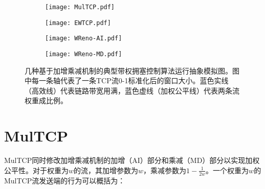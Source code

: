 \documentclass[winfonts]{njuthesis}
\begin{document}
\begin{figure}[ht!]
  \centering
  \begin{subfigure}{.4\textwidth}
    \centering
      \texttt{[image: MulTCP.pdf]}
      \label{fig:MulTCP}
  \end{subfigure}
  \hspace{1em}
  \begin{subfigure}{.4\textwidth}
    \centering
      \texttt{[image: EWTCP.pdf]}
      \label{fig:EWTCP}
  \end{subfigure}
  \begin{subfigure}{.4\textwidth}
    \centering
      \texttt{[image: WReno-AI.pdf]}
      \label{fig:WReno-AI}
  \end{subfigure}
  \hspace{1em}
  \begin{subfigure}{.4\textwidth}
    \centering
      \texttt{[image: WReno-MD.pdf]}
      \label{fig:WReno-MD}
  \end{subfigure}
  \caption{几种基于加增乘减机制的典型带权拥塞控制算法运行抽象模拟图。图中每一条轴代表了一条TCP流0-1标准化后的窗口大小。蓝色实线（高效线）代表链路带宽用满，蓝色虚线（加权公平线）代表两条流权重成比例。}
\label{fig:AIMD}
\end{figure}

\section{MulTCP}

MulTCP\cite{crowcroft1998differentiated}同时修改加增乘减机制的加增（AI）部分和乘减（MD）部分以实现加权公平性。对于权重为$w$的流，其加增参数为$w$，乘减参数为$1-\frac{1}{2w}$。一个权重为$w$的MulTCP流发送端的行为可以概括为：
\end{document}
